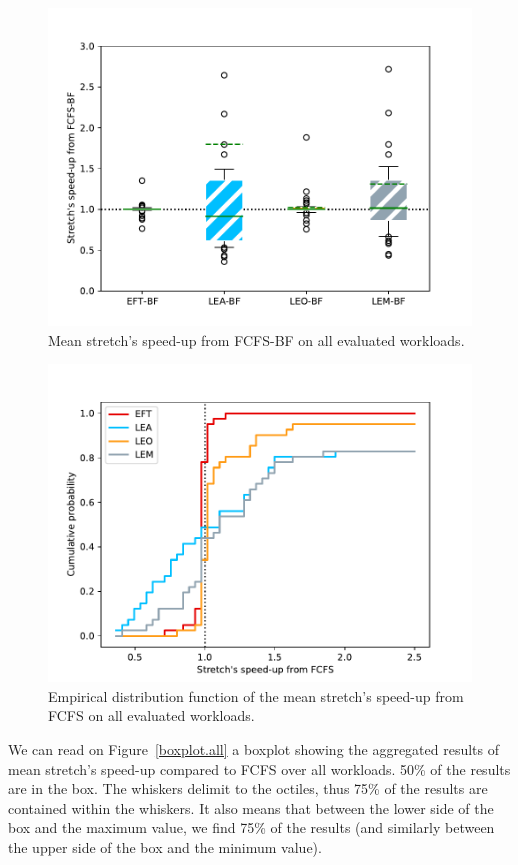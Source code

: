 \documentclass[conference,10pt]{IEEEtran}
\begin{document}
\begin{figure}\centering\includegraphics[scale=0.47]{../MBSS/plot/Boxplot/box_plot_mean_stretch_all_workloads_bf.pdf}\caption{Mean stretch's speed-up from FCFS-BF on all evaluated workloads.}\label{boxplot.all_bf}\end{figure}
\begin{figure}\centering\includegraphics[scale=0.47]{../MBSS/plot/ECDF/ecdf_mean_stretch_all_workloads.pdf}\caption{Empirical distribution function of the mean stretch's speed-up from FCFS on all evaluated workloads.}\end{figure}

We can read on Figure~\ref{boxplot.all} a boxplot showing the aggregated
results of mean stretch's speed-up compared to FCFS over all workloads.
50\% of the results are in the box.
The whiskers delimit to the octiles, thus 75\% of the results are contained
within the whiskers. It also means that between the lower side of the box and the maximum value,
we find 75\% of the results (and similarly between the upper side of the box and the minimum value).
\end{document}
